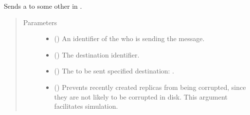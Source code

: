 \documentclass[letterpaper,10pt,english]{sphinxmanual}
\begin{document}
\begin{fulllineitems}
\begin{fulllineitems}
\label{\detokenize{app.domain:app.domain.cluster_groups.Cluster.route_part}}
Sends a {\hyperref[\detokenize{app.domain.helpers:app.domain.helpers.smart_dataclasses.FileBlockData}]{}} to some other
{\hyperref[\detokenize{app.domain:app.domain.network_nodes.Node}]{}} in
{\hyperref[\detokenize{app.domain:app.domain.cluster_groups.Cluster.members}]{}}.
\begin{quote}\begin{description}
\item[{Parameters}] \leavevmode\begin{itemize}
\item {} 
 () \textendash{} An identifier of the
{\hyperref[\detokenize{app.domain:app.domain.network_nodes.Node}]{}}
who is sending the message.

\item {} 
 () \textendash{} The destination
{\hyperref[\detokenize{app.domain:app.domain.network_nodes.Node}]{}}
identifier.

\item {} 
 ({\hyperref[\detokenize{app.domain.helpers:app.domain.helpers.smart_dataclasses.FileBlockData}]{}}) \textendash{} The {\hyperref[\detokenize{app.domain.helpers:app.domain.helpers.smart_dataclasses.FileBlockData}]{}}
to be sent specified destination: .

\item {} 
 () \textendash{} Prevents recently created replicas from being
corrupted, since they are not likely to be corrupted in disk.
This argument facilitates simulation.


\end{itemize}
\end{description}
\end{quote}
\end{fulllineitems}
\end{fulllineitems}
\end{document}
